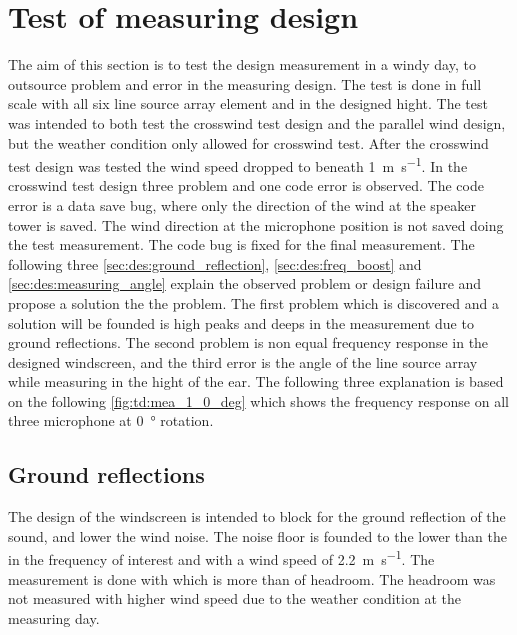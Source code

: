 \section{Test of measuring design}
The aim of this section is to test the design measurement in a windy day, to outsource problem and error in the measuring design. The test is done in full scale with all six line source array element and in the designed hight. The test was intended to both test the crosswind test design and the parallel wind design, but the weather condition only allowed for crosswind test. After the crosswind test design was tested the wind speed dropped to beneath \SI{1}{\meter\per\second}.
In the crosswind test design three problem and one code error is observed. The code error is a data save bug, where only the direction of the wind at the speaker tower is saved. The wind direction at the microphone position is not saved doing the test measurement. The code bug is fixed for the final measurement. The following three \autoref{sec:des:ground_reflection}, \autoref{sec:des:freq_boost} and \autoref{sec:des:measuring_angle} explain the observed problem or design failure and propose a solution the the problem. The first problem which is discovered and a solution will be founded is high peaks and deeps in the measurement due to ground reflections. The second problem is non equal frequency response in the designed windscreen, and the third error is the angle of the line source array while measuring in the hight of the ear.  The following three explanation is based on the following \autoref{fig:td:mea_1_0_deg} which shows the frequency response on all three microphone at \SI{0}{\degree} rotation.





\subsection{Ground reflections}\label{sec:des:ground_reflection}
The design of the windscreen is intended to block for the ground reflection of the sound, and lower the wind noise. The noise floor is founded to the lower than the  in the frequency of interest and with a wind speed of \SI{2.2}{\meter\per\second}. The measurement is done with  which is more than  of headroom. The headroom was not measured with higher wind speed due to the weather condition at the measuring day. 

